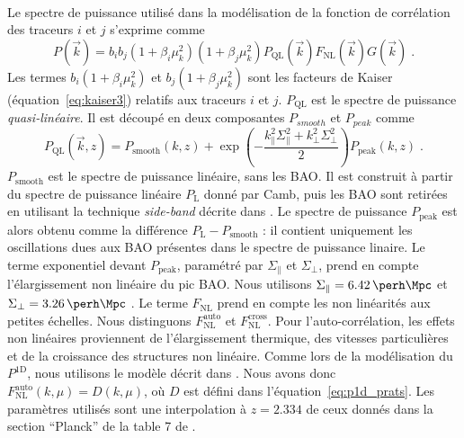 \documentclass[11pt, twoside, a4paper, openright]{report}
\begin{document}
\paragraph{}
Le spectre de puissance utilisé dans la modélisation de la fonction de corrélation des traceurs $i$ et $j$ s'exprime comme
\begin{equation}
  \label{eq:pk_model1}
  P(\vec k) = b_i b_j (1+\beta_i \mu_k^2)(1+\beta_j \mu_k^2) P_{\mathrm{QL}}(\vec k) F_{\mathrm{NL}}(\vec k) G(\vec k) \; .
\end{equation}
Les termes $b_i (1+\beta_i \mu_k^2)$ et $b_j (1+\beta_j \mu_k^2)$ sont les facteurs de Kaiser (équation~\ref{eq:kaiser3}) relatifs aux traceurs $i$ et $j$.
$P_{\mathrm{QL}}$ est le spectre de puissance \emph{quasi-linéaire}. Il est découpé en deux composantes $P_{smooth}$ et $P_{peak}$ comme
\begin{equation}
  P_{\mathrm{QL}}(\vec k, z) = P_{\mathrm{smooth}}(k, z) + \exp(- \frac{k_{\parallel}^2 \Sigma_{\parallel}^2 + k_{\perp}^2 \Sigma_{\perp}^2}{2}) P_{\mathrm{peak}}(k,z) \; .
\end{equation}
$P_{\mathrm{smooth}}$ est le spectre de puissance linéaire, sans les BAO. Il est construit à partir du spectre de puissance linéaire $P_{\mathrm{L}}$ donné par Camb, puis les BAO sont retirées en utilisant la technique \emph{side-band} décrite dans \textcite{Kirkby2013}.
Le spectre de puissance $P_{\mathrm{peak}}$ est alors obtenu comme la différence $P_{\mathrm{L}} - P_{\mathrm{smooth}}$ : il contient uniquement les oscillations dues aux BAO présentes dans le spectre de puissance linaire.
Le terme exponentiel devant $P_{\mathrm{peak}}$, paramétré par $\Sigma_{\parallel}$ et $\Sigma_{\perp}$, prend en compte l'élargissement non linéaire du pic BAO. Nous utilisons $\Sigma_{\parallel} = \SI{6.42}{\perh\Mpc}$ et $\Sigma_{\perp} = \SI{3.26}{\perh\Mpc}$  \autocite{eisenstein_robustness_2007}.
Le terme $F_{\mathrm{NL}}$ prend en compte les non linéarités aux petites échelles. Nous distinguons $F_{\mathrm{NL}}^{\mathrm{auto}}$ et $F_{\mathrm{NL}}^{\mathrm{cross}}$. Pour l'auto-corrélation, les effets non linéaires proviennent de l'élargissement thermique, des vitesses particulières et de la croissance des structures non linéaire.
Comme lors de la modélisation du $P^{\mathrm{1D}}$, nous utilisons le modèle décrit dans \textcite{Arinyo-i-Prats2015}. Nous avons donc $F_{\mathrm{NL}}^{\mathrm{auto}}(k, \mu) = D(k, \mu)$, où $D$ est défini dans l'équation~\ref{eq:p1d_prats}. Les paramètres utilisés sont une interpolation à $z = \num{2.334}$ de ceux donnés dans la section ``Planck'' de la table 7 de \textcite{Arinyo-i-Prats2015}.
\end{document}
